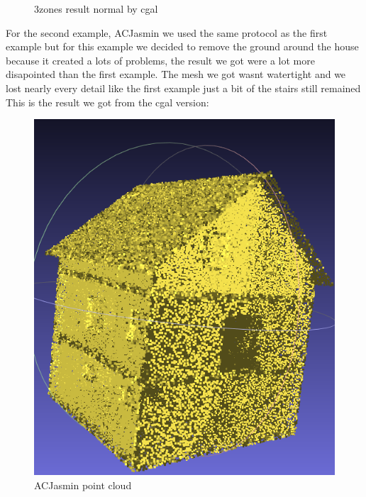 \documentclass{article}
\begin{document}
\begin{figure}[H]
\begin{minipage}[t]{0.27\textwidth}
    \caption*{3zones result normal by cgal}
  \end{minipage}
\end{figure}  

For the second example, ACJasmin we used the same protocol as the first example but for 
this example we decided to remove the ground around the house because it created a lots of problems,
the result we got were a lot more disapointed than the first example.
The mesh we got  wasnt watertight and we lost nearly every detail like the first example 
just a bit of the stairs still remained
This is the result we got from the cgal version:
\vspace{\baselineskip}
\begin{figure}[H]
  \centering
  \begin{minipage}[t]{0.29\textwidth}
    \includegraphics[width=\textwidth]{../../images/screen_kinetic/ACJasmin_point_cloud.png}
    \caption*{ACJasmin point cloud}
  \end{minipage}
  \begin{minipage}[t]{0.29\textwidth}

\end{minipage}
\end{figure}
\end{document}
